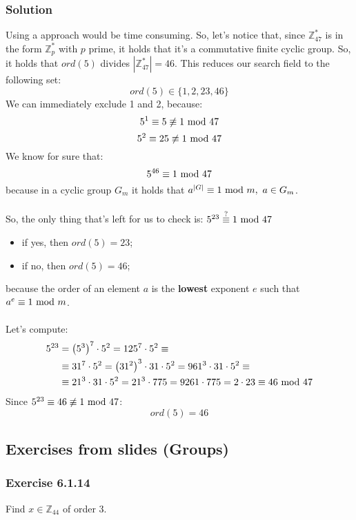 \subsubsection*{Solution}
Using a  approach would be time consuming. So, let's notice that, since $\mathbb{Z}_{47}^*$ is in the form $\mathbb{Z}_p^*$ with $p$ prime, it holds that it's a commutative finite cyclic group. So, it holds that $ord(5)$ divides $|\mathbb{Z}_{47}^*|=46$. This reduces our search field to the following set:
$$ord(5)\in\{1, 2, 23, 46\}$$
We can immediately exclude 1 and 2, because:
$$5^1\equiv5\not\equiv1\text{ mod }47$$
$$5^2\equiv25\not\equiv1\text{ mod }47$$
We know for sure that:
$$5^{46}\equiv1\text{ mod }47$$
because in a cyclic group $G_m$ it holds that $a^{|G|}\equiv1\text{ mod } m,\ a\in G_m$.\\\\
So, the only thing that's left for us to check is: $5^{23}\stackrel{\text{?}}{\equiv}1\text{ mod }47$
\begin{itemize}
    \item if yes, then $ord(5)=23$;
    \item if no, then $ord(5)=46$;
\end{itemize}
because the order of an element $a$ is the \textbf{lowest} exponent $e$ such that $a^e\equiv1\text{ mod } m$.\\\\
Let's compute:
\begin{align*}
    5^{23}&=\left(5^3\right)^7\cdot5^2=125^7\cdot5^2\equiv\\
    &\equiv31^7\cdot5^2=\left(31^2\right)^3\cdot31\cdot5^2=961^3\cdot31\cdot5^2\equiv\\
    &\equiv21^3\cdot31\cdot5^2 =21^3\cdot775=9261\cdot775=2\cdot23\equiv46\text{ mod }47
\end{align*}
Since $5^{23}\equiv46\not\equiv1\text{ mod }47$:
$$ord(5)=46$$

\newpage
\subsection{Exercises from slides (Groups)}
\subsubsection{Exercise 6.1.14}
Find $x\in\mathbb{Z}_{44}$ of order 3.

